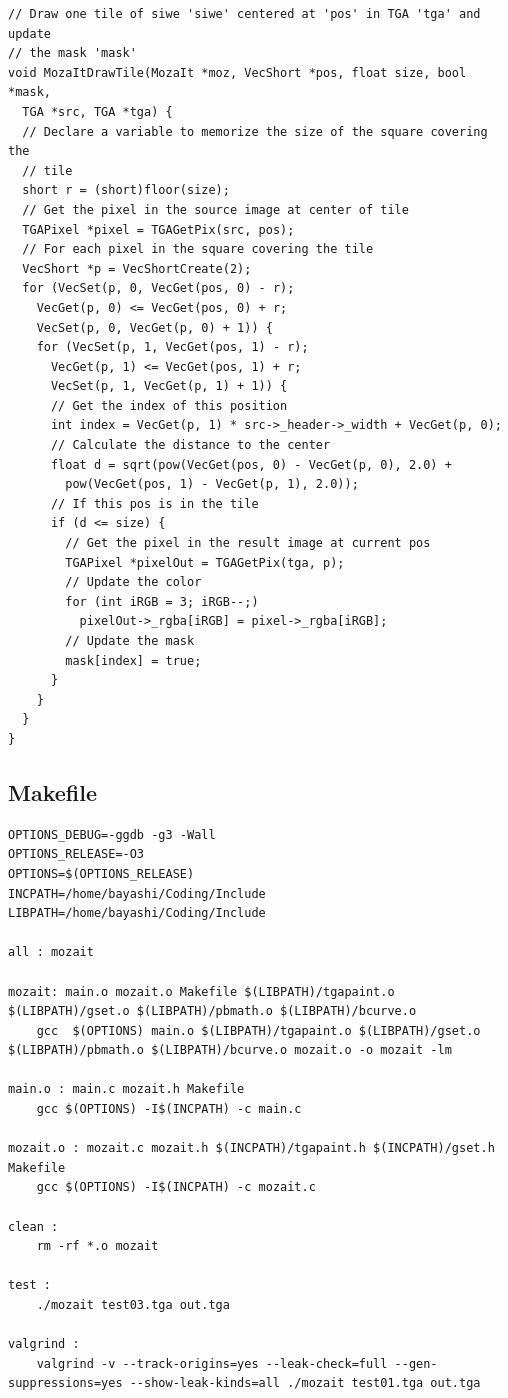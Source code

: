 \documentclass[12pt, a4paper]{article}
\begin{document}
\begin{scriptsize}
\begin{ttfamily}
\begin{lstlisting}
// Draw one tile of siwe 'siwe' centered at 'pos' in TGA 'tga' and update
// the mask 'mask'
void MozaItDrawTile(MozaIt *moz, VecShort *pos, float size, bool *mask, 
  TGA *src, TGA *tga) {
  // Declare a variable to memorize the size of the square covering the 
  // tile
  short r = (short)floor(size);
  // Get the pixel in the source image at center of tile
  TGAPixel *pixel = TGAGetPix(src, pos);
  // For each pixel in the square covering the tile
  VecShort *p = VecShortCreate(2);
  for (VecSet(p, 0, VecGet(pos, 0) - r); 
    VecGet(p, 0) <= VecGet(pos, 0) + r; 
    VecSet(p, 0, VecGet(p, 0) + 1)) {
    for (VecSet(p, 1, VecGet(pos, 1) - r); 
      VecGet(p, 1) <= VecGet(pos, 1) + r; 
      VecSet(p, 1, VecGet(p, 1) + 1)) {
      // Get the index of this position
      int index = VecGet(p, 1) * src->_header->_width + VecGet(p, 0);
      // Calculate the distance to the center
      float d = sqrt(pow(VecGet(pos, 0) - VecGet(p, 0), 2.0) + 
        pow(VecGet(pos, 1) - VecGet(p, 1), 2.0));
      // If this pos is in the tile
      if (d <= size) {
        // Get the pixel in the result image at current pos
        TGAPixel *pixelOut = TGAGetPix(tga, p);
        // Update the color
        for (int iRGB = 3; iRGB--;)
          pixelOut->_rgba[iRGB] = pixel->_rgba[iRGB];
        // Update the mask
        mask[index] = true;
      }
    }
  }
}
\end{lstlisting}
\end{ttfamily}
\end{scriptsize}

\subsection{Makefile}

\begin{scriptsize}
\begin{ttfamily}
\begin{lstlisting}
OPTIONS_DEBUG=-ggdb -g3 -Wall
OPTIONS_RELEASE=-O3 
OPTIONS=$(OPTIONS_RELEASE)
INCPATH=/home/bayashi/Coding/Include
LIBPATH=/home/bayashi/Coding/Include

all : mozait

mozait: main.o mozait.o Makefile $(LIBPATH)/tgapaint.o $(LIBPATH)/gset.o $(LIBPATH)/pbmath.o $(LIBPATH)/bcurve.o
	gcc  $(OPTIONS) main.o $(LIBPATH)/tgapaint.o $(LIBPATH)/gset.o $(LIBPATH)/pbmath.o $(LIBPATH)/bcurve.o mozait.o -o mozait -lm

main.o : main.c mozait.h Makefile
	gcc $(OPTIONS) -I$(INCPATH) -c main.c

mozait.o : mozait.c mozait.h $(INCPATH)/tgapaint.h $(INCPATH)/gset.h Makefile
	gcc $(OPTIONS) -I$(INCPATH) -c mozait.c

clean : 
	rm -rf *.o mozait

test :
	./mozait test03.tga out.tga

valgrind :
	valgrind -v --track-origins=yes --leak-check=full --gen-suppressions=yes --show-leak-kinds=all ./mozait test01.tga out.tga
\end{lstlisting}
\end{ttfamily}
\end{scriptsize}
\end{document}
